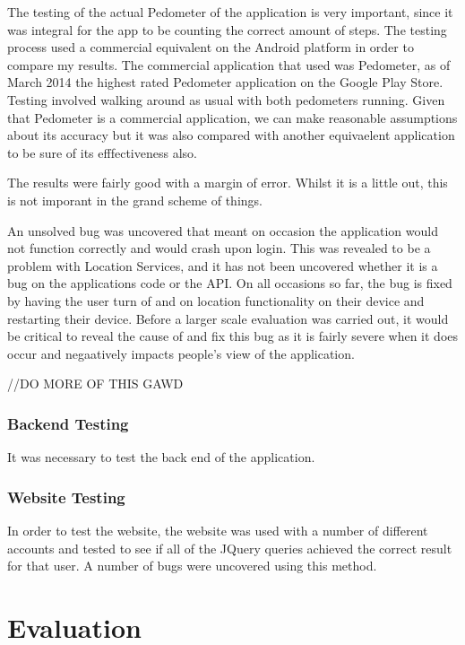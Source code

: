\documentclass{l4proj}
\begin{document}
The testing of the actual Pedometer of the application is very important, since it was integral for the app to be counting the correct amount of steps. The testing process used a commercial equivalent on the Android platform in order to compare my results. The commercial application that used was Pedometer, as of March 2014 the highest rated Pedometer application on the Google Play Store. Testing involved walking around as usual with both pedometers running. Given that Pedometer is a commercial application, we can make reasonable assumptions about its accuracy but it was also compared with another equivaelent application to be sure of its efffectiveness also.

The results were fairly good with a margin of error. Whilst it is a little out, this is not imporant in the grand scheme of things.

An unsolved bug was uncovered that meant on occasion the application would not function correctly and would crash upon login. This was revealed to be a problem with Location Services, and it has not been uncovered whether it is a bug on the applications code or the API. On all occasions so far, the bug is fixed by having the user turn of and on location functionality on their device and restarting their device. Before a larger scale evaluation was carried out, it would be critical to reveal the cause of and fix this bug as it is fairly severe when it does occur and negaatively impacts people's view of the application.

//DO MORE OF THIS GAWD

\subsection{Backend Testing}

It was necessary to test the back end of the application.

\subsection{Website Testing}

In order to test the website, the website was used with a number of different accounts and tested to see if all of the JQuery queries achieved the correct result for that user. A number of bugs were uncovered using this method.


\chapter{Evaluation}
\end{document}

